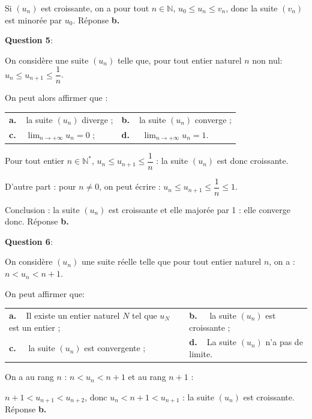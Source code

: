 \documentclass[10pt]{article}
\providecommand{\N}{\mathbb{N}}
\begin{document}
Si $\left(u_n\right)$ est croissante, on a pour tout $n \in \N$,\: $u_0 \leqslant u_n \leqslant v_n$, donc la suite $\left(v_n\right)$ est minorée par $u_0$. Réponse \textbf{b.}

\medskip

\textbf{Question 5}:

\medskip

On considère une suite $\left(u_n\right)$ telle que, pour tout entier naturel $n$ non nul: $u_n \leqslant  u_{n+1}  \leqslant \dfrac1n$.

On peut alors affirmer que : 

\begin{center}
\begin{tabularx}{\linewidth}{X X}
\textbf{a.~~}la suite $\left(u_n\right)$ diverge ;&\textbf{b.~~}la suite $\left(u_n\right)$ converge ;\\
\textbf{c.~~}$\displaystyle\lim_{n \to + \infty} u_n =  0$ ;&\textbf{d.~~} $\displaystyle\lim_{n \to + \infty} u_n =  1$.
\end{tabularx}
\end{center}

Pour tout entier $n \in \N^{*}$, \: $u_n \leqslant u_{n+1} \leqslant \dfrac1n$ : la suite 
$\left(u_n\right)$ est donc croissante.

D'autre part : pour $n \ne 0$, on peut écrire : $u_n \leqslant u_{n+1} \leqslant \dfrac1n \leqslant 1$.

Conclusion  : la suite $\left(u_n\right)$ est croissante et elle majorée par 1 : elle converge donc. Réponse \textbf{b.}
\medskip

\textbf{Question 6}:

\medskip

On considère $\left(u_n\right)$ une suite réelle telle que pour tout entier naturel $n$, on a : $n < u_n < n + 1$. 

On peut affirmer que:

\begin{center}
\begin{tabularx}{\linewidth}{X X}
\textbf{a.~~}Il existe un entier naturel $N$ tel que $u_N$ est un entier ;&\textbf{b.~~} la suite $\left(u_n\right)$ est croissante ;\\
\textbf{c.~~} la suite $\left(u_n\right)$ est convergente ;&\textbf{d.~~}La suite $\left(u_n\right)$ n'a pas de limite.
\end{tabularx}
\end{center}

On a au rang $n$ : $n < u_n < n+1$ et au rang $n+1$ :

$n + 1 < u_{n+1} < u_{n+2}$, donc $u_n < n+1 < u_{n+1}$ : la suite $\left(u_n\right)$ est croissante. Réponse \textbf{b.}
\end{document}
